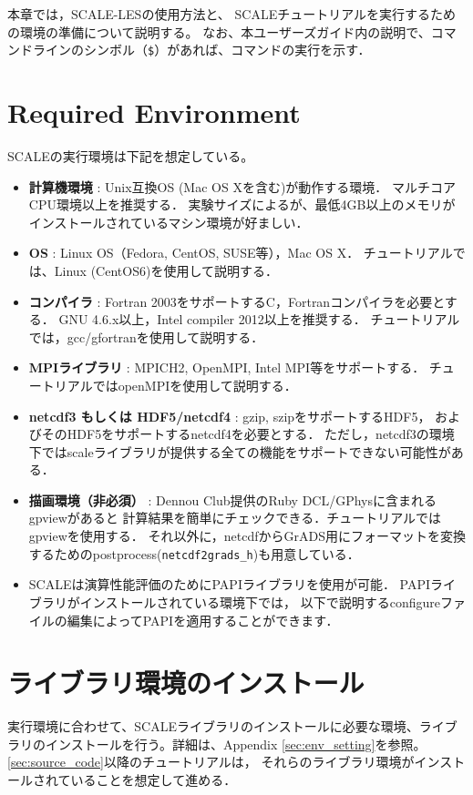 本章では，SCALE-LESの使用方法と、
SCALEチュートリアルを実行するための環境の準備について説明する。
なお、本ユーザーズガイド内の説明で、コマンドラインのシンボル（\verb|$|）があれば、コマンドの実行を示す．

\section{Required Environment}
\label{sec:req_env}
SCALEの実行環境は下記を想定している。

\begin{itemize}
  \item {\bf 計算機環境} : Unix互換OS (Mac OS Xを含む)が動作する環境．
        マルチコアCPU環境以上を推奨する．
        実験サイズによるが、最低4GB以上のメモリが
        インストールされているマシン環境が好ましい．
  \item {\bf OS} : Linux OS（Fedora, CentOS, SUSE等），Mac OS X．
        チュートリアルでは、Linux (CentOS6)を使用して説明する．
  \item {\bf コンパイラ} : Fortran 2003をサポートするC，Fortranコンパイラを必要とする．
        GNU 4.6.x以上，Intel compiler 2012以上を推奨する．
        チュートリアルでは，gcc/gfortranを使用して説明する．
  \item {\bf MPIライブラリ} : MPICH2, OpenMPI, Intel MPI等をサポートする．
        チュートリアルではopenMPIを使用して説明する．
  \item {\bf netcdf3 もしくは HDF5/netcdf4} : gzip, szipをサポートするHDF5，
        およびそのHDF5をサポートするnetcdf4を必要とする．
        ただし，netcdf3の環境下ではscaleライブラリが提供する全ての機能をサポートできない可能性がある．
  \item {\bf 描画環境（非必須）} : Dennou Club提供のRuby DCL/GPhysに含まれるgpviewがあると
        計算結果を簡単にチェックできる．チュートリアルではgpviewを使用する．
        それ以外に，netcdfからGrADS用にフォーマットを変換するためのpostprocess(\verb|netcdf2grads_h|)も用意している．
  \item SCALEは演算性能評価のためにPAPIライブラリを使用が可能．
        PAPIライブラリがインストールされている環境下では，
        以下で説明するconfigureファイルの編集によってPAPIを適用することができます．
\end{itemize}



\section{ライブラリ環境のインストール}
実行環境に合わせて、SCALEライブラリのインストールに必要な環境、ライブラリのインストールを行う。詳細は、Appendix \ref{sec:env_setting}を参照。
\ref{sec:source_code}以降のチュートリアルは，
それらのライブラリ環境がインストールされていることを想定して進める．



